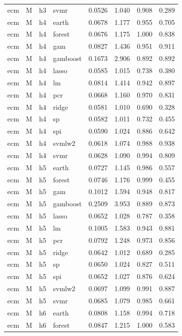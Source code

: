 \begin{ThreePartTable}
\begin{longtable}[t]{llclcccc}
ecm & M & h3 & svmr & 0.0526 & 1.040 & 0.908 & 0.289\\
\addlinespace
ecm & M & h4 & earth & 0.0678 & 1.177 & 0.955 & 0.705\\
ecm & M & h4 & forest & 0.0676 & 1.175 & 1.000 & 0.838\\
ecm & M & h4 & gam & 0.0827 & 1.436 & 0.951 & 0.911\\
ecm & M & h4 & gamboost & 0.1673 & 2.906 & 0.892 & 0.892\\
ecm & M & h4 & lasso & 0.0585 & 1.015 & 0.738 & 0.380\\
ecm & M & h4 & lm & 0.0814 & 1.414 & 0.942 & 0.897\\
ecm & M & h4 & pcr & 0.0668 & 1.160 & 0.970 & 0.831\\
ecm & M & h4 & ridge & 0.0581 & 1.010 & 0.690 & 0.328\\
ecm & M & h4 & sp & 0.0582 & 1.011 & 0.732 & 0.455\\
ecm & M & h4 & spi & 0.0590 & 1.024 & 0.886 & 0.642\\
ecm & M & h4 & svmlw2 & 0.0618 & 1.074 & 0.988 & 0.938\\
ecm & M & h4 & svmr & 0.0628 & 1.090 & 0.994 & 0.809\\
\addlinespace
ecm & M & h5 & earth & 0.0727 & 1.145 & 0.986 & 0.557\\
ecm & M & h5 & forest & 0.0746 & 1.176 & 0.999 & 0.455\\
ecm & M & h5 & gam & 0.1012 & 1.594 & 0.948 & 0.817\\
ecm & M & h5 & gamboost & 0.2509 & 3.953 & 0.889 & 0.873\\
ecm & M & h5 & lasso & 0.0652 & 1.028 & 0.787 & 0.358\\
ecm & M & h5 & lm & 0.1005 & 1.583 & 0.943 & 0.881\\
ecm & M & h5 & pcr & 0.0792 & 1.248 & 0.973 & 0.856\\
ecm & M & h5 & ridge & 0.0642 & 1.012 & 0.689 & 0.285\\
ecm & M & h5 & sp & 0.0650 & 1.024 & 0.827 & 0.511\\
ecm & M & h5 & spi & 0.0652 & 1.027 & 0.876 & 0.624\\
ecm & M & h5 & svmlw2 & 0.0697 & 1.099 & 0.991 & 0.887\\
ecm & M & h5 & svmr & 0.0685 & 1.079 & 0.985 & 0.661\\
\addlinespace
ecm & M & h6 & earth & 0.0808 & 1.158 & 0.994 & 0.718\\
ecm & M & h6 & forest & 0.0847 & 1.215 & 1.000 & 0.583\\

\end{longtable}
\end{ThreePartTable}
